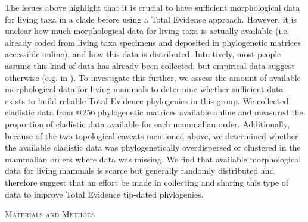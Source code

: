\documentclass[12pt,letterpaper]{article}
\renewcommand{\section}[1]{%
\bigskip
\begin{center}
\begin{Large}
\normalfont\scshape #1
\medskip
\end{Large}
\end{center}}
\begin{document}
The issues above highlight that it is crucial to have sufficient morphological data for living taxa in a clade before using a Total Evidence approach.
However, it is unclear how much morphological data for living taxa is actually available (i.e. already coded from living taxa specimens and deposited in phylogenetic matrices accessible online), and how this data is distributed.
Intuitively, most people assume this kind of data has already been collected, but empirical data suggest otherwise (e.g. in \cite{ronquista2012,slaterphylogenetic2013,beckancient2014}).
To investigate this further, we assess the amount of available morphological data for living mammals to determine whether sufficient data exists to build reliable Total Evidence phylogenies in this group.
We collected cladistic data from @256 phylogenetic matrices available online and measured the proportion of cladistic data available for each mammalian order.
Additionally, because of the two topological caveats mentioned above, we determined whether the available cladistic data was phylogenetically overdispersed or clustered in the mammalian orders where data was missing. 
We find that available morphological data for living mammals is scarce but generally randomly distributed and therefore suggest that an effort be made in collecting and sharing this type of data to improve Total Evidence tip-dated phylogenies.


%
%
 

\section{Materials and Methods}
\end{document}
